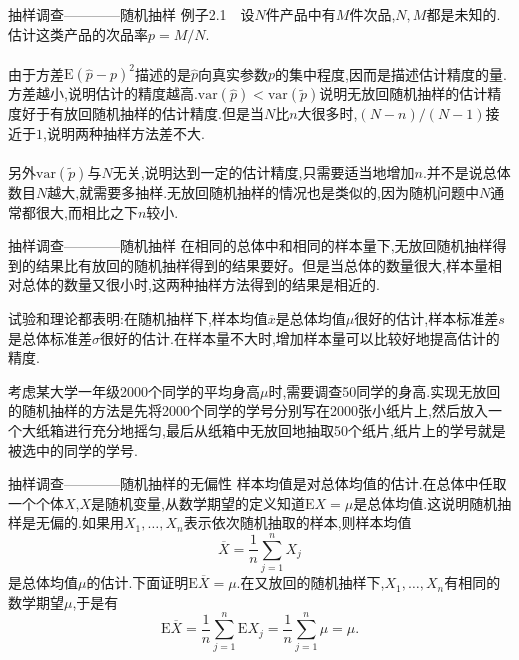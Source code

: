 \begin{frame}{抽样调查————随机抽样}
例子2.1$\quad$设$N$件产品中有$M$件次品,$N,M$都是未知的.估计这类产品的次品率$p=M/N$.
\\ \hspace*{\fill} \\
由于方差$\mathrm{E}(\hat{p}-p)^2$描述的是$\hat{p}$向真实参数$p$的集中程度,因而是描述估计精度的量.方差越小,说明估计的精度越高.$\mathrm{var}(\hat{p})<\mathrm{var}(\tilde{p})$说明无放回随机抽样的估计精度好于有放回随机抽样的估计精度.但是当$N$比$n$大很多时,$(N-n)/(N-1)$接近于$1$,说明两种抽样方法差不大.
\\ \hspace*{\fill} \\
另外$\mathrm{var}(\tilde{p})$与$N$无关,说明达到一定的估计精度,只需要适当地增加$n$.并不是说总体数目$N$越大,就需要多抽样.无放回随机抽样的情况也是类似的,因为随机问题中$N$通常都很大,而相比之下$n$较小.
\end{frame}

\begin{frame}{抽样调查————随机抽样}
在相同的总体中和相同的样本量下,无放回随机抽样得到的结果比有放回的随机抽样得到的结果要好。但是当总体的数量很大,样本量相对总体的数量又很小时,这两种抽样方法得到的结果是相近的.

试验和理论都表明:在随机抽样下,样本均值$\overline{x}$是总体均值$\mu$很好的估计,样本标准差$s$是总体标准差$\sigma$很好的估计.在样本量不大时,增加样本量可以比较好地提高估计的精度.

考虑某大学一年级2000个同学的平均身高$\mu$时,需要调查50同学的身高.实现无放回的随机抽样的方法是先将2000个同学的学号分别写在2000张小纸片上,然后放入一个大纸箱进行充分地摇匀,最后从纸箱中无放回地抽取50个纸片,纸片上的学号就是被选中的同学的学号.
\end{frame}

\begin{frame}{抽样调查————随机抽样的无偏性}
样本均值是对总体均值的估计.在总体中任取一个个体$X$,$X$是随机变量,从数学期望的定义知道$\mathrm{E}X=\mu$是总体均值.这说明随机抽样是无偏的.如果用$X_1,\dots,X_n$表示依次随机抽取的样本,则样本均值
\begin{equation}
\overline{X} = \frac{1}{n}\sum_{j=1}^{n}X_j
\end{equation}
是总体均值$\mu$的估计.下面证明$\mathrm{E}\overline{X} = \mu$.在又放回的随机抽样下,$X_1,\dots,X_n$有相同的数学期望$\mu$,于是有
\begin{equation}
\mathrm{E}\overline{X} = \frac{1}{n}\sum_{j=1}^{n}\mathrm{E}X_j = \frac{1}{n}\sum_{j=1}^{n}\mu = \mu.
\end{equation}
\end{frame}

